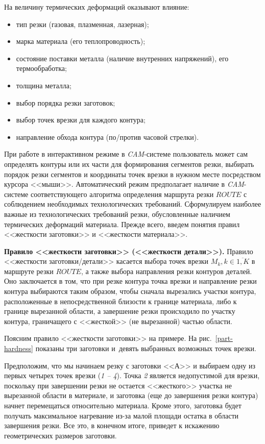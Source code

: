 \documentclass[11pt,twoside,openany]{report}
\begin{document}
На величину термических деформаций оказывают влияние:
\begin{itemize}
\item	тип резки (газовая, плазменная, лазерная);
\item	марка материала (его теплопроводность);
\item	состояние поставки металла (наличие внутренних напряжений), его термообработка;
\item	толщина металла;
\item	выбор порядка резки заготовок;
\item	выбор точек врезки для каждого контура;
\item	направление обхода контура (по/против часовой стрелки).
\end{itemize}

При работе в интерактивном режиме в
\textit{CAM}-системе
пользователь может сам определять контуры или их части
для формирования сегментов резки,
выбирать порядок резки сегментов и координаты точек врезки
в нужном месте посредством курсора <<мыши>>.
Автоматический режим предполагает наличие в
\textit{CAM}-системе
соответствующего алгоритма определения маршрута резки
$ROUTE$
с соблюдением необходимых технологических требований.
Сформулируем наиболее важные из технологических требований резки,
обусловленные наличием термических деформаций материала.
Прежде всего, введем понятия правил
<<жесткости заготовки>> и <<жесткости материала>>.

{\bf Правило <<жесткости заготовки>> (<<жесткости детали>>).}
Правило <<жесткости заготовки/детали>> касается выбора точек врезки
$M_k, k \in \overline{1,K}$
в маршруте резки  $ROUTE$,
а также выбора направления резки контуров деталей.
Оно заключается в том, что при резке контура точка
врезки и направление резки контура выбираются таким образом,
чтобы сначала вырезались участки контура,
расположенные в непосредственной близости к границе материала,
либо к границе вырезанной области,
а завершение резки происходило по участку контура,
граничащего с <<жесткой>> (не вырезанной) частью области.

Поясним правило <<жесткости заготовки>> на примере.
На рис.~\ref{part-hardness}
показаны три заготовки
и~девять выбранных возможных точек врезки.

Предположим, что мы начинаем резку с заготовки <<А>>
и выбираем одну из первых четырех точек врезки
(\textit{1 -- 4}).
Точка \textit{2} является недопустимой для врезки,
поскольку при завершении резки не остается
<<жесткого>> участка не вырезанной области в материале,
и заготовка (еще до завершения резки контура)
начнет перемещаться относительно материала.
Кроме этого, заготовка будет получать максимальное
нагревание из-за малой площади остатка в области завершения резки.
Все это, в конечном итоге,
приведет к искажению геометрических размеров заготовки.
\end{document}
